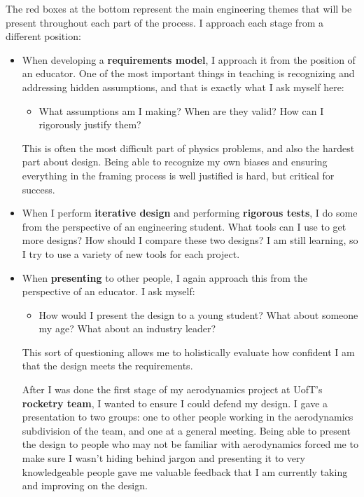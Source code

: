{    The red boxes at the bottom represent the main engineering themes that will be present throughout each part of the process.
    \newpage
    I approach each stage from a different position:
    \begin{itemize}
        \item When developing a \textbf{requirements model}, I approach it from the position of an educator. One of the most important things in teaching is recognizing and addressing hidden assumptions, and that is exactly what I ask myself here:
        \begin{itemize}
            \item What assumptions am I making? When are they valid? How can I rigorously justify them?
        \end{itemize}
        This is often the most difficult part of physics problems, and also the hardest part about design. Being able to recognize my own biases and ensuring everything in the framing process is well justified is hard, but critical for success.
        \item When I perform \textbf{iterative design} and performing \textbf{rigorous tests}, I do some from the perspective of an engineering student. What tools can I use to get more designs? How should I compare these two designs? I am still learning, so I try to use a variety of new tools for each project.
        \item When \textbf{presenting} to other people, I again approach this from the perspective of an educator. I ask myself:
        \begin{itemize}
            \item How would I present the design to a young student? What about someone my age? What about an industry leader?
        \end{itemize}
        This sort of questioning allows me to holistically evaluate how confident I am that the design meets the requirements.
        \begin{example}
            After I was done the first stage of my aerodynamics project at UofT's \textbf{rocketry team}, I wanted to ensure I could defend my design. I gave a presentation to two groups: one to other people working in the aerodynamics subdivision of the team, and one at a general meeting. Being able to present the design to people who may not be familiar with aerodynamics forced me to make sure I wasn’t hiding behind jargon and presenting it to very knowledgeable people gave me valuable feedback that I am currently taking and improving on the design.
        \end{example}
    \end{itemize}
}